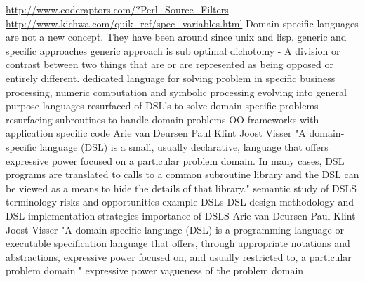 \url{http://www.coderaptors.com/?Perl_Source_Filters}
\newline
\url{http://www.kichwa.com/quik_ref/spec_variables.html}
\newline
Domain specific languages are not a new concept.  They have been around since unix and lisp.
\newline
generic and specific approaches
\newline
generic approach is sub optimal
\newline
dichotomy - A division or contrast between two things that are or are represented as being opposed or entirely different.
\newline
dedicated language for solving problem in specific 
\newline
business processing, numeric computation and symbolic processing
\newline
evolving into general purpose languages
\newline
resurfaced of DSL's to solve domain specific problems resurfacing
\newline
subroutines to handle domain problems
\newline
OO frameworks with application specific code
\newline
Arie van Deursen Paul Klint Joost Visser 
"A domain-specific language (DSL) is a small, usually
declarative, language that offers expressive power focused
on a particular problem domain. In many cases,
DSL programs are translated to calls to a common subroutine
library and the DSL can be viewed as a means to
hide the details of that library."
\newline
semantic study of DSLS
\newline
terminology
\newline
risks and opportunities
\newline
example DSLs
\newline
DSL design methodology and DSL implementation strategies
\newline
importance of DSLS
\newline
Arie van Deursen Paul Klint Joost Visser 
"A domain-specific language (DSL) is a programming
language or executable specification language
that offers, through appropriate notations and abstractions,
expressive power focused on, and usually
restricted to, a particular problem domain."
\newline
expressive power
\newline
vagueness of the problem domain
\newline
